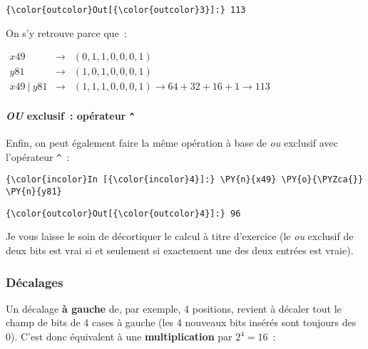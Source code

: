 \begin{Verbatim}[commandchars=\\\{\},frame=single,framerule=0.3mm,rulecolor=\color{cellframecolor}]
{\color{outcolor}Out[{\color{outcolor}3}]:} 113
\end{Verbatim}
            
    On s'y retrouve parce que~:

\(\begin{array}{rcl} x49 & \rightarrow & (0,1,1,0,0,0,1) \\ y81 & \rightarrow & (1,0,1,0,0,0,1) \\ x49\ |\ y81 & \rightarrow & (1,1,1,0,0,0,1) \rightarrow 64 + 32 + 16 + 1 \rightarrow 113 \end{array}\)

    \hypertarget{ou-exclusif-opuxe9rateur}{%
\paragraph{\texorpdfstring{\emph{OU} exclusif~: opérateur
\texttt{\^{}}}{OU exclusif~: opérateur \^{}}}\label{ou-exclusif-opuxe9rateur}}

    Enfin, on peut également faire la même opération à base de \emph{ou}
exclusif avec l'opérateur \texttt{\^{}}~:

    \begin{Verbatim}[commandchars=\\\{\},frame=single,framerule=0.3mm,rulecolor=\color{cellframecolor}]
{\color{incolor}In [{\color{incolor}4}]:} \PY{n}{x49} \PY{o}{\PYZca{}} \PY{n}{y81}
\end{Verbatim}


\begin{Verbatim}[commandchars=\\\{\},frame=single,framerule=0.3mm,rulecolor=\color{cellframecolor}]
{\color{outcolor}Out[{\color{outcolor}4}]:} 96
\end{Verbatim}
            
    Je vous laisse le soin de décortiquer le calcul à titre d'exercice (le
\emph{ou} exclusif de deux bits est vrai si et seulement si exactement
une des deux entrées est vraie).

    \hypertarget{duxe9calages}{%
\subsubsection{Décalages}\label{duxe9calages}}

    Un décalage \textbf{à gauche} de, par exemple, 4 positions, revient à
décaler tout le champ de bits de 4 cases à gauche (les 4 nouveaux bits
insérés sont toujours des 0). C'est donc équivalent à une
\textbf{multiplication} par \(2^4 = 16\)~:

